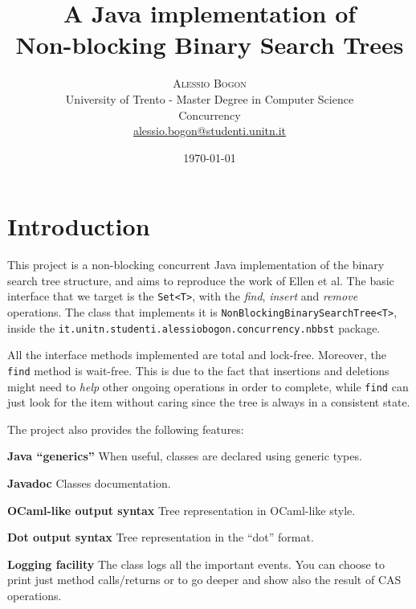 \documentclass[a4paper,draft,12pt]{article}
\title{\textbf{A Java implementation of \\Non-blocking Binary Search Trees}} %
\author{
    \textsc{Alessio Bogon}\\[2mm] %
    \normalsize University of Trento - Master Degree in Computer Science\\ %
    \normalsize Concurrency\\
    \href{mailto:alessio.bogon@studenti.unitn.it}{alessio.bogon@studenti.unitn.it} %
}
\date{\today}
\begin{document}
\maketitle


\section{Introduction} %
\label{sec:introduction}
This project is a non-blocking concurrent Java implementation of the binary search tree structure, and aims to reproduce the work of Ellen et al\cite{ellen10}.
The basic interface that we target is the \texttt{Set<T>}, with the \emph{find}, \emph{insert} and \emph{remove} operations.
The class that implements it is \texttt{Non\-Blocking\-Binary\-Search\-Tree\-<T>}, inside the \texttt{it.unitn.studenti.alessiobogon.concurrency.nbbst} package.

All the interface methods implemented are total and lock-free. Moreover, the \texttt{find} method is wait-free.
This is due to the fact that insertions and deletions might need to \emph{help} other ongoing operations in order to complete, while \texttt{find} can just look for the item without caring since the tree is always in a consistent state.

The project also provides the following features:
\begin{itemize*}
    \item \textbf{Java ``generics''} When useful, classes are declared using generic types.
    \item \textbf{Javadoc} Classes documentation.
    \item \textbf{OCaml-like output syntax} Tree representation in OCaml-like style.
    \item \textbf{Dot output syntax} Tree representation in the ``dot'' format.
    \item \textbf{Logging facility} The class logs all the important events. You can choose to print just method calls/returns or to go deeper and show also the result of CAS operations.
\end{itemize*}

\end{document}
